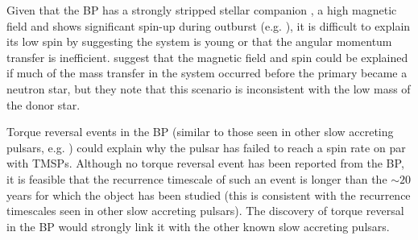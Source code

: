 %
%

\par Given that the BP has a strongly stripped stellar companion \citep{Bildsten_Nuclear}, a high magnetic field and shows significant spin-up during outburst (e.g. \citealp{Finger_BP,Sanna_BP}), it is difficult to explain its low spin by suggesting the system is young or that the angular momentum transfer is inefficient. \citealp{Rappaport_BPHistory} suggest that the magnetic field and spin could be explained if much of the mass transfer in the system occurred before the primary became a neutron star, but they note that this scenario is inconsistent with the low mass of the donor star.
\par Torque reversal events in the BP (similar to those seen in other slow accreting pulsars, e.g. \citealp{Bildsten_Rev}) could explain why the pulsar has failed to reach a spin rate on par with TMSPs. Although no torque reversal event has been reported from the BP, it is feasible that the recurrence timescale of such an event is longer than the $\sim20$ years for which the object has been studied (this is consistent with the recurrence timescales seen in other slow accreting pulsars). The discovery of torque reversal in the BP would strongly link it with the other known slow accreting pulsars. %

%
%

%
%


